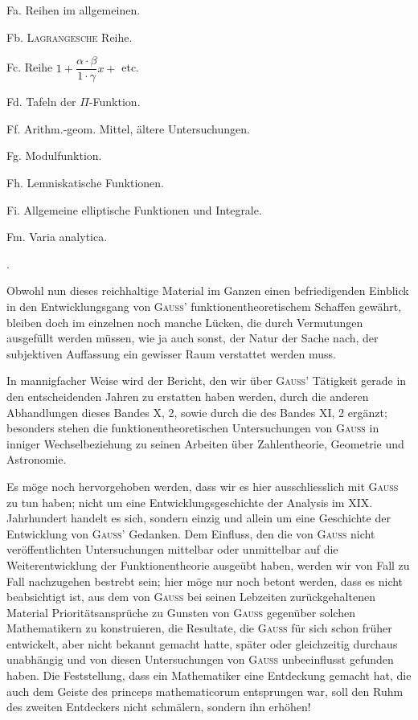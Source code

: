{\begin{list}{}{\setlength{\leftmargin}{1.7em}\setlength{\rightmargin}{0pt}\setlength{\itemsep}{0pt}\setlength{\parsep}{0pt}}
\begin{list}{}{\setlength{\leftmargin}{1.4em}\setlength{\itemsep}{0pt}\setlength{\parsep}{0pt}}
\item Fa. Reihen im allgemeinen.
\item Fb. \textsc{Lagrangesche} Reihe.
\item Fc. Reihe \(1+\dfrac{\alpha\cdot\beta}{1\cdot\gamma}x+{}\) etc.
\item Fd. Tafeln der \(\Pi\)-Funktion.
\item Ff. Arithm.-geom. Mittel, ältere Untersuchungen.
\item Fg. Modulfunktion.
\item Fh. Lemniskatische Funktionen.
\item Fi. Allgemeine elliptische Funktionen und Integrale.
\item Fm. Varia analytica.
\end{list}
\end{list}}.

\clearpage{}
Obwohl nun dieses reichhaltige Material im Ganzen einen befriedigenden
Einblick in den Entwicklungsgang von \textsc{Gauss}’ funktionentheoretischem Schaffen
gewährt, bleiben doch im einzelnen noch manche Lücken, die durch Vermutungen
ausgefüllt werden müssen, wie ja auch sonst, der Natur der Sache
nach, der subjektiven Auffassung ein gewisser Raum verstattet werden muss.

In mannigfacher Weise wird der Bericht, den wir über \textsc{Gauss}’ Tätigkeit
gerade in den entscheidenden Jahren zu erstatten haben werden, durch die
anderen Abhandlungen dieses Bandes X, 2, sowie durch die des Bandes XI, 2
ergänzt; besonders stehen die funktionentheoretischen Untersuchungen von
\textsc{Gauss} in inniger Wechselbeziehung zu seinen Arbeiten über Zahlentheorie,
Geometrie und Astronomie.

Es möge noch hervorgehoben werden, dass wir es hier ausschliesslich mit
\textsc{Gauss} zu tun haben; nicht um eine Entwicklungsgeschichte der Analysis im
XIX. Jahrhundert handelt es sich, sondern einzig und allein um eine Geschichte
der Entwicklung von \textsc{Gauss}’ Gedanken. Dem Einfluss, den die von
\textsc{Gauss} nicht veröffentlichten Untersuchungen mittelbar oder unmittelbar auf
die Weiterentwicklung der Funktionentheorie ausgeübt haben, werden wir von
Fall zu Fall nachzugehen bestrebt sein; hier möge nur noch betont werden,
dass es nicht beabsichtigt ist, aus dem von \textsc{Gauss} bei seinen Lebzeiten zurückgehaltenen
Material Prioritätsansprüche zu Gunsten von \textsc{Gauss} gegenüber
solchen Mathematikern zu konstruieren, die Resultate, die \textsc{Gauss} für sich
schon früher entwickelt, aber nicht bekannt gemacht hatte, später oder gleichzeitig
durchaus unabhängig und von diesen Untersuchungen von \textsc{Gauss} unbeeinflusst
gefunden haben. Die Feststellung, dass ein Mathematiker eine Entdeckung
gemacht hat, die auch dem Geiste des princeps mathematicorum
entsprungen war, soll den Ruhm des zweiten Entdeckers nicht schmälern,
sondern ihn erhöhen!
